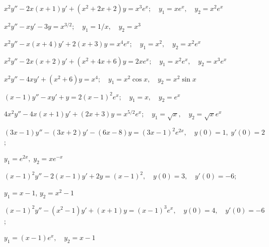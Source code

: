 \begin{exerciselist}
  \item\label{exer:5.7.23}
        $x^{2}y''-2x(x+1)y'+(x^{2}+2x+2)y=x^{3}e^{x};\quad y_{1}=xe^{x},\quad y_{2}=x^{2}e^{x}$

  \item\label{exer:5.7.24} $x^{2}y''-xy'-3y=x^{3/2};\quad y_{1}=1/x,\quad y_{2}=x^{3}$

  \item\label{exer:5.7.25}
        $x^{2}y''-x(x+4)y'+2(x+3)y=x^{4}e^{x};\quad y_{1}=x^{2},\quad y_{2}=x^{2}e^{x}$

  \item\label{exer:5.7.26}
        $x^{2}y''-2x(x+2)y'+(x^{2}+4x+6)y=2xe^{x};\quad y_{1}=x^{2}e^{x},\quad y_{2}=x^{3}e^{x}$

  \item\label{exer:5.7.27}
        $x^{2}y''-4xy'+(x^{2}+6)y=x^{4};\quad y_{1}=x^{2}\cos x,\quad y_{2}=x^{2}\sin x$

  \item\label{exer:5.7.28} $(x-1)y''-xy'+y=2(x-1)^{2}e^{x};\quad y_{1}=x,\quad y_{2}=e^{x}$

  \item\label{exer:5.7.29}
        $4x^{2}y''-4x(x+1)y'+(2x+3)y=x^{5/2}e^{x};\quad y_{1}=\sqrt{x},\quad y_{2}=\sqrt{x}e^{x}$


  \item\label{exer:5.7.30} $(3x-1)y''-(3x+2)y'-(6x-8)y=(3x-1)^{2}e^{2x},\quad y(0)=1,\; y'(0)=2$;

  $y_{1}=e^{2x},\;y_{2}=xe^{-x}$

  \item\label{exer:5.7.31} $(x-1)^{2}y''-2(x-1)y'+2y=(x-1)^{2},\quad y(0)=3,\quad y'(0)=-6$;

  $y_{1}=x-1$,\; $y_{2}=x^{2}-1$

  \item\label{exer:5.7.32}
        $(x-1)^{2}y''-(x^{2}-1)y'+(x+1)y=(x-1)^{3}e^{x},\quad y(0)=4,\quad y'(0)=-6$;

  $y_{1}=(x-1)e^{x},\quad y_{2}=x-1$



\end{exerciselist}
